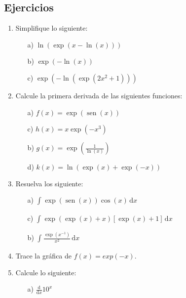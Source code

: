 \documentclass{article}
\numberwithin{equation}{section}
\DeclareMathOperator{\sen}{sen}
\newcommand{\col}[1]{\textcolor{ProcessBlue}{#1}}
\newcommand{\integrate}[4]{\int_{#1}^{#2} \! {#3} \, \mathrm{d} {#4} }
\newcommand{\der}[1]{\frac{\mathrm{d}}{\mathrm{d}#1}}
\begin{document}
\subsection{\col{Ejercicios}}

\begin{enumerate}
    \item Simplifique lo siguiente:
    \begin{multicols}{3}
        \begin{enumerate}
            \item[a)] $\ln{(\exp(x-\ln(x)))}$
            \item[b)] $\exp(-\ln(x))$
            \item[c)] $\exp(-\ln(\exp(2x^2+1)))$
        \end{enumerate}
    \end{multicols}
    \item Calcule la primera derivada de las siguientes funciones:
    \begin{multicols}{2}
        \begin{enumerate}
            \item[a)] $f(x)=\exp(\sen(x))$
            \item[c)] $h(x)=x\exp(-x^3)$
            \item[b)] $g(x)=\exp\left(\frac{1}{\ln(x)}\right)$
            \item[d)] $k(x)=\ln(\exp(x)+\exp(-x))$
        \end{enumerate}
    \end{multicols}
    \item Resuelva los siguiente: 
    \begin{multicols}{2}
        \begin{enumerate}
            \item[a)] $\integrate{}{}{\exp(\sen(x))\cos(x)}{x}$
            \item[c)] $\integrate{}{}{\exp(\exp(x)+x)[\exp(x)+1]}{x}$
            \item[b)] $\integrate{}{}{\frac{\exp(x^{-1})}{x^2}}{x}$
        \end{enumerate}
    \end{multicols}
    \item Trace la gráfica de $f(x)=exp(-x)$.
    \item Calcule lo siguiente:
    \begin{multicols}{2}
        \begin{enumerate}
            \item[a)] $\der{x}10^x$

\end{enumerate}
\end{multicols}
\end{enumerate}
\end{document}
